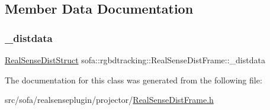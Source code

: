 \subsection{Member Data Documentation}
\mbox{\label{classsofa_1_1rgbdtracking_1_1_real_sense_dist_frame_a95575d91b20d0cdc8cb9a9ba3795f928}} 
\subsubsection{\texorpdfstring{\+\_\+distdata}{\_distdata}}
{\footnotesize\ttfamily \hyperlink{structsofa_1_1rgbdtracking_1_1_real_sense_dist_frame_1_1_real_sense_dist_struct}{Real\+Sense\+Dist\+Struct} sofa\+::rgbdtracking\+::\+Real\+Sense\+Dist\+Frame\+::\+\_\+distdata}



The documentation for this class was generated from the following file\+:\begin{DoxyCompactItemize}
\item 
src/sofa/realsenseplugin/projector/\hyperlink{_real_sense_dist_frame_8h}{Real\+Sense\+Dist\+Frame.\+h}\end{DoxyCompactItemize}
